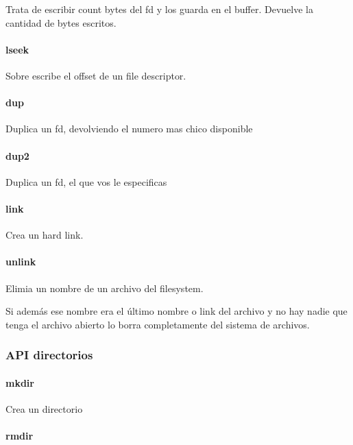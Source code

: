 \documentclass{article}
\begin{document}
Trata de escribir count bytes del fd y los guarda en el buffer. Devuelve
la cantidad de bytes escritos.

\paragraph{lseek}\label{lseek}

Sobre escribe el offset de un file descriptor.

\paragraph{dup}\label{dup}

Duplica un fd, devolviendo el numero mas chico disponible

\paragraph{dup2}\label{dup2}

Duplica un fd, el que vos le especificas

\paragraph{link}\label{link}

Crea un hard link.

\paragraph{unlink}\label{unlink}

Elimia un nombre de un archivo del filesystem.

Si además ese nombre era el último nombre o link del archivo y no hay
nadie que tenga el archivo abierto lo borra completamente del sistema de
archivos.

\subsubsection{API directorios}\label{api-directorios}

\paragraph{\texorpdfstring{mkdir }{mkdir }}\label{mkdir}

Crea un directorio

\paragraph{\texorpdfstring{rmdir }{rmdir }}\label{rmdir}
\end{document}
